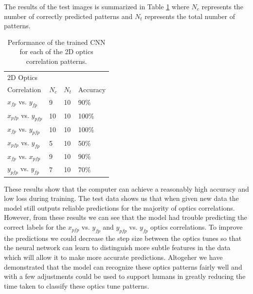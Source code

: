 \documentclass[conference]{IEEEtran}
\begin{document}
The results of the test images is summarized in Table  \ref{tab:results} where $N_{c}$ represents the number of correctly predicted patterns and $N_{t}$ represents the total number of patterns.
\begin{table}[h]
	\begin{center}
		\begin{tabular}{ p{2cm}p{1cm}p{1cm}p{1cm}  } %
                  \hline
                  2D Optics \\Correlation  & $N_{c}$  & $N_{t}$ & Accuracy \\ \hline \hline
	          $x_{fp}$ vs. $y_{fp}$ & 9 & 10 &  90\% \\
                   $x_{pfp}$ vs. $y_{pfp}$ & 10 & 10 & 100\%\\
                   $x_{fp}$ vs. $y_{pfp}$ & 10 & 10 & 100\%\\
                   $x_{pfp}$ vs. $y_{fp}$ & 5 & 10 & 50\%\\
                   $x_{fp}$ vs. $x_{pfp}$ & 9 & 10 & 90\%\\
                   $y_{pfp}$ vs. $y_{fp}$ & 7 & 10 & 70\%\\

                  

    
		  \hline 
		\end{tabular}
	\end{center}
	\caption{Performance of the trained CNN for each of the 2D optics correlation patterns.}
	\label{tab:results}
\end{table}




These results show that the computer can achieve a reasonably high accuracy and low loss during training. The test data shows us that when given new data the model still outputs reliable predictions for the majority of optics correlations. However, from these results we can see that the model had trouble predicting the correct labels for the $x_{pfp}$ vs. $y_{fp}$ and  $y_{pfp}$ vs. $y_{fp}$  optics correlations. To improve the predictions we could decrease the step size between the optics tunes so that the neural network can learn to distinguish more subtle features in the data which will allow it to make more accurate predictions. Altogeher we have demonstrated that the model can recognize these optics patterns fairly well and with a few adjustments could be used to support humans in greatly reducing the time taken to classify these optics tune patterns.









   

\end{document}
